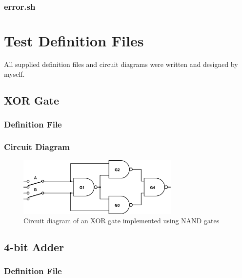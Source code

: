 \documentclass[a4paper,10pt]{article}
\begin{document}
\subsubsection{error.sh}

\pagebreak

\section{Test Definition Files}
\label{sec:examples}

All supplied definition files and circuit diagrams were written and designed by myself.

\subsection{XOR Gate}

\subsubsection{Definition File}


\subsubsection{Circuit Diagram}
\begin{figure}[h]
 \centering
 \includegraphics[width=8cm]{../../examples/xor.png}
 \caption{Circuit diagram of an XOR gate implemented using NAND gates}
 \label{fig:example-xor}
\end{figure}

\subsection{4-bit Adder}

\subsubsection{Definition File}

\end{document}
